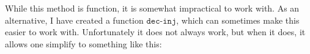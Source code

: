 While this method is function, it is somewhat impractical to work with. As an
alternative, I have created a function $\texttt{dec-inj}$, which can sometimes
make this easier to work with. Unfortunately it does not always work, but when
it does, it allows one simplify to something like this:

\begin{code}
  \>[0]\<[2]%
\>[2] \AgdaSymbol{:}  \AgdaSymbol{\{}\AgdaBound{$\Delta$}\AgdaSymbol{\}}   \<%
\\
\>[2]\<[24]%
\>[24] \AgdaSymbol{(}\AgdaBound{$\Delta$}     \AgdaSymbol{)}\<%
\\
\>[0]\<[2]%
\>[2] \AgdaSymbol{\{}\AgdaBound{$\Delta$}\AgdaSymbol{\}} \AgdaSymbol{(}\AgdaInductiveConstructor{$\alpha$} \AgdaBound{$\tau$}\AgdaSymbol{)} \AgdaInductiveConstructor{$\alpha$} \AgdaSymbol{=}    \AgdaSymbol{\{} \AgdaSymbol{(} \AgdaSymbol{)}   \AgdaSymbol{\})} \AgdaSymbol{(}\AgdaBound{$\Delta$}  \AgdaBound{$\tau$} \AgdaSymbol{)}\<%
\\
\>[0]\<[2]%
\>[2] \AgdaSymbol{(}\AgdaInductiveConstructor{$\alpha$} \AgdaBound{$\tau$}\AgdaSymbol{)} \AgdaInductiveConstructor{$\rho$} \AgdaSymbol{=}   \AgdaSymbol{())}\<%
\\
\>[0]\<[2]%
\>[2] \AgdaSymbol{(}\AgdaInductiveConstructor{$\rho$} \AgdaBound{$\sigma$}\AgdaSymbol{)} \AgdaInductiveConstructor{$\alpha$} \AgdaSymbol{=}   \AgdaSymbol{())}\<%
\\
\>[0]\<[2]%
\>[2] \AgdaSymbol{\{}\AgdaBound{$\Delta$}\AgdaSymbol{\}} \AgdaSymbol{(}\AgdaInductiveConstructor{$\rho$} \AgdaBound{$\sigma$}\AgdaSymbol{)} \AgdaInductiveConstructor{$\rho$} \AgdaSymbol{=}    \AgdaSymbol{\{} \AgdaSymbol{(} \AgdaSymbol{)}   \AgdaSymbol{\})} \AgdaSymbol{(}\AgdaBound{$\Delta$}  \AgdaBound{$\sigma$} \AgdaSymbol{)}\<%
\end{code}

